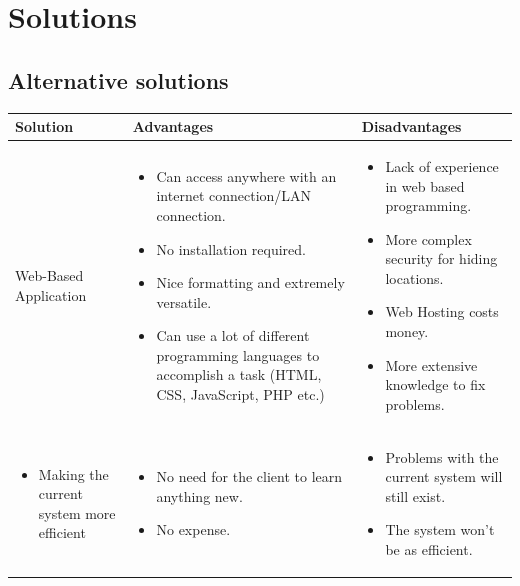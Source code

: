 {{{\begin{itemize}
\end{itemize}

\section{Solutions}

\subsection{Alternative solutions}


\begin{center}
\begin{longtable}{|p{5cm}|p{5cm}|p{5cm}|}
    \hline
 \textbf{Solution} & \textbf{Advantages} & \textbf{Disadvantages} \\ \hline
Web-Based Application 

& 
\begin{itemize}
\item Can access anywhere with an internet connection/LAN connection.
\item No installation required.
\item Nice formatting and extremely versatile.
\item Can use a lot of different programming languages to accomplish a task (HTML, CSS, JavaScript, PHP etc.)
\end{itemize}
 &
\begin{itemize}
\item  Lack of experience in web based programming.
\item More complex security for hiding locations.
\item Web Hosting costs money.
\item More extensive knowledge to fix problems.
\end{itemize}
\\ \hline
\begin{itemize}
\item Making the current system more efficient
\end{itemize}

& 
\begin{itemize}
\item No need for the client to learn anything new.
\item No expense.
\end{itemize}

&
\begin{itemize}
\item  Problems with the current system will still exist.
\item The system won't be as efficient.
\end{itemize}
\\ \hline


\end{longtable}
\end{center}}}}
